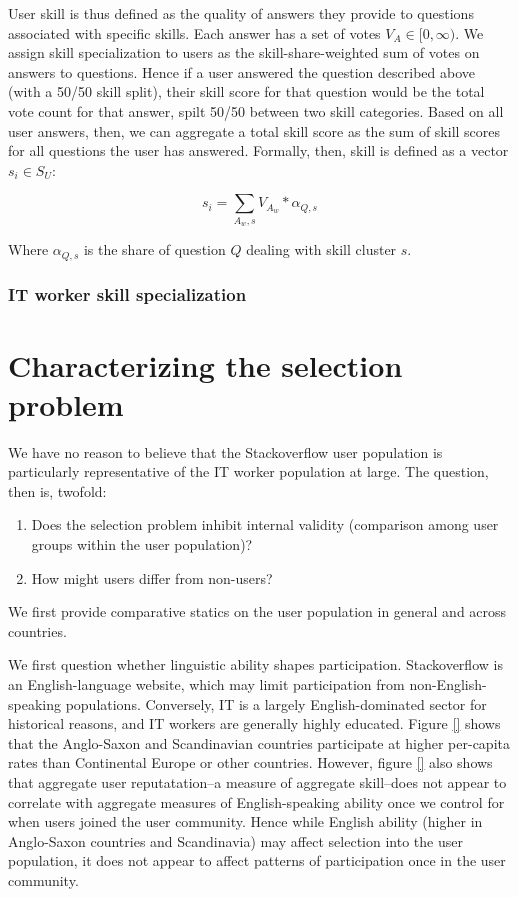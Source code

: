 \documentclass[11pt]{article}
\begin{document}
User skill is thus defined as the quality of answers they provide to
questions associated with specific skills. Each answer has a set of
votes $V_A \in [0, \infty)$. We assign skill specialization to users
as the skill-share-weighted sum of votes on answers to
questions. Hence if a user answered the question described above (with
a 50/50 skill split), their skill score for that question would be the
total vote count for that answer, spilt 50/50 between two skill
categories. Based on all user answers, then, we can aggregate a total
skill score as the sum of skill scores for all questions the user has
answered.  Formally, then, skill is defined as a vector $s_i \in S_U$:

\begin{equation}
  \label{eq:4}
  s_i = \sum_{A_w, s} V_{A_w} * \alpha_{Q, s}
\end{equation}

Where $\alpha_{Q,s}$ is the share of question $Q$ dealing with skill
cluster $s$.

\subsubsection{IT worker skill specialization}
\label{sec:it-worker-skill-1}


\section{Characterizing the selection problem}
\label{sec:char-select-probl}

We have no reason to believe that the Stackoverflow user population is
particularly representative of the IT worker population at large. The
question, then is, twofold:
\begin{enumerate}
\item Does the selection problem inhibit internal validity (comparison
  among user groups within the user population)?
\item How might users differ from non-users?
\end{enumerate}

We first provide comparative statics on the user population in general
and across countries. 

We first question whether linguistic ability shapes
participation. Stackoverflow is an English-language website, which may
limit participation from non-English-speaking populations. Conversely,
IT is a largely English-dominated sector for historical reasons, and
IT workers are generally highly educated. Figure \ref{} shows that the Anglo-Saxon and
Scandinavian countries participate at higher per-capita rates than
Continental Europe or other countries. However, figure \ref{} also
shows that aggregate user reputatation--a measure of aggregate
skill--does not appear to correlate with aggregate measures of
English-speaking ability once we control for when users joined the
user community. Hence while English ability (higher in Anglo-Saxon
countries and Scandinavia) may affect selection into the user
population, it does not appear to affect patterns of participation
once in the user community. 
\end{document}
